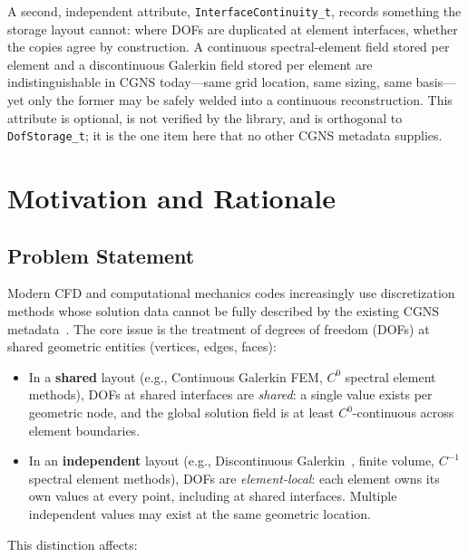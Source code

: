 \documentclass[11pt,letterpaper]{article}
\begin{document}
A second, independent attribute, \texttt{InterfaceContinuity\_t}, records something the
storage layout cannot: where DOFs are duplicated at element interfaces, whether the copies
agree by construction.  A continuous spectral-element field stored per element and a
discontinuous Galerkin field stored per element are indistinguishable in CGNS today---same
grid location, same sizing, same basis---yet only the former may be safely welded into a
continuous reconstruction.  This attribute is optional, is not verified by the library, and
is orthogonal to \texttt{DofStorage\_t}; it is the one item here that no other CGNS metadata
supplies.


\section{Motivation and Rationale}

\subsection{Problem Statement}

Modern CFD and computational mechanics codes increasingly use
discretization methods whose solution data cannot be fully described
by the existing CGNS metadata~\cite{cgns-sids}.  The core issue is the
treatment of degrees of freedom (DOFs) at shared geometric entities
(vertices, edges, faces):

\begin{itemize}[leftmargin=2em]
\item In a \textbf{shared} layout (e.g., Continuous
  Galerkin FEM, $C^0$ spectral element methods), DOFs at shared
  interfaces are \emph{shared}: a single value exists per geometric
  node, and the global solution field is at least $C^0$-continuous
  across element boundaries.

\item In an \textbf{independent} layout (e.g., Discontinuous
  Galerkin~\cite{hesthaven2008,cockburn2000}, finite volume,
  $C^{-1}$ spectral element methods), DOFs
  are \emph{element-local}: each element owns its own values at every
  point, including at shared interfaces.  Multiple independent values
  may exist at the same geometric location.
\end{itemize}

This distinction affects:
\end{document}
